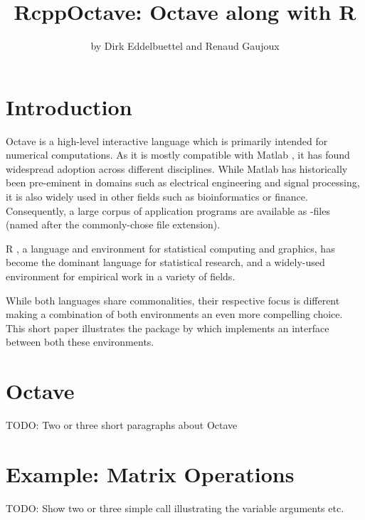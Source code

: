 
\title{RcppOctave: Octave along with R}  %
\author{by Dirk Eddelbuettel and Renaud Gaujoux}

\maketitle


\section{Introduction}

Octave \citep{Eaton:2008} is a high-level interactive language which is
primarily intended for numerical computations. As it is mostly compatible
with Matlab \citep{MATLAB:2010}, it has found widespread adoption across
different disciplines. While Matlab has historically been pre-eminent in
domains such as electrical engineering and signal processing, it is also
widely used in other fields such as bioinformatics or finance.  Consequently,
a large corpus of application programs are available as -files
(named after the commonly-chose file extension).

R \citep{R:2012}, a language and environment for statistical
computing and graphics, has become the dominant language for statistical
research, and a widely-used environment for empirical work in a variety of
fields.

While both languages share commonalities, their respective focus is different
making a combination of both environments an even more compelling choice.
This short paper illustrates the  package by
\cite{CRAN:RcppOctave} which implements an interface between both these
environments.

\section{Octave}

TODO: Two or three short paragraphs about Octave

\section{Example: Matrix Operations}  %

TODO: Show two or three simple call illustrating the variable arguments etc.
